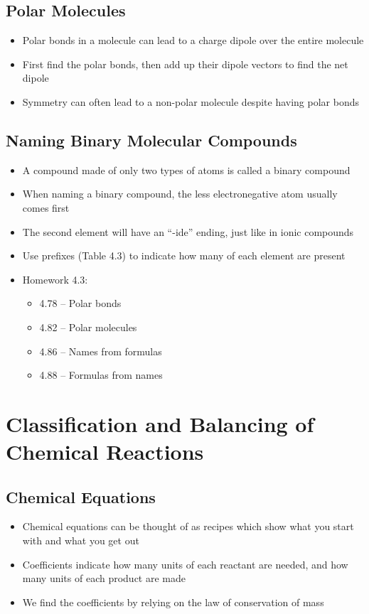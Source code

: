 \documentclass[12pt, openany, letterpaper]{memoir}
\begin{document}
\section{Polar Molecules}
\begin{itemize}
	\item Polar bonds in a molecule can lead to a charge dipole over the entire molecule
	\item First find the polar bonds, then add up their dipole vectors to find the net dipole
	\item Symmetry can often lead to a non-polar molecule despite having polar bonds
\end{itemize}
\section{Naming Binary Molecular Compounds}
\begin{itemize}
	\item A compound made of only two types of atoms is called a binary compound
	\item When naming a binary compound, the less electronegative atom usually comes first
	\item The second element will have an ``-ide'' ending, just like in ionic compounds
	\item Use prefixes (Table 4.3) to indicate how many of each element are present
	\item Homework 4.3:
	      \begin{itemize}
		      \item 4.78 -- Polar bonds
		      \item 4.82 -- Polar molecules
		      \item 4.86 -- Names from formulas
		      \item 4.88 -- Formulas from names
	      \end{itemize}
\end{itemize}

\chapter{Classification and Balancing of Chemical Reactions}
\section{Chemical Equations}
\begin{itemize}
	\item Chemical equations can be thought of as recipes which show what you start with and what you get out
	\item Coefficients indicate how many units of each reactant are needed, and how many units of each product are made
	\item We find the coefficients by relying on the law of conservation of mass
\end{itemize}
\end{document}
